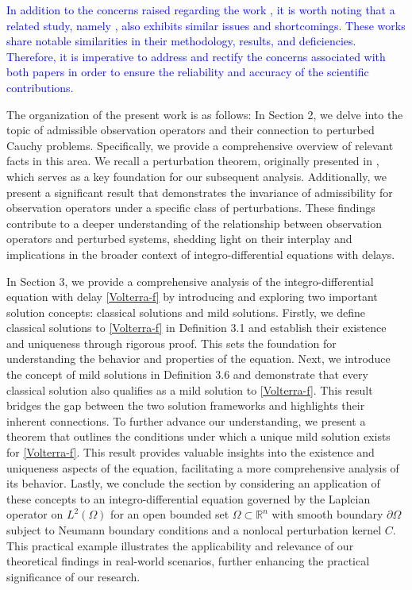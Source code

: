 \documentclass[12pt]{amsart}
\newcommand{\R}{{\mathbb R}}
\def\Om{\Omega}
\theoremstyle{definition}
\theoremstyle{remark}
\theoremstyle{example}
\def\R{\mathbb R}
\begin{document}
\textcolor{blue}{In addition to the concerns raised regarding the work \cite{Zaza}, it is worth noting that a related study, namely \cite{Zaza1}, also exhibits similar issues and shortcomings. These works share notable similarities in their methodology, results, and deficiencies. Therefore, it is imperative to address and rectify the concerns associated with both papers in order to ensure the reliability and accuracy of the scientific contributions.}

The organization of the present work is as follows: In Section 2, we delve into the topic of admissible observation operators and their connection to perturbed Cauchy problems. Specifically, we provide a comprehensive overview of relevant facts in this area. We recall a perturbation theorem, originally presented in \cite{Hadd}, which serves as a key foundation for our subsequent analysis. Additionally, we present a significant result that demonstrates the invariance of admissibility for observation operators under a specific class of perturbations. These findings contribute to a deeper understanding of the relationship between observation operators and perturbed systems, shedding light on their interplay and implications in the broader context of integro-differential equations with delays.

In Section 3, we provide a comprehensive analysis of the integro-differential equation with delay \eqref{Volterra-f} by introducing and exploring two important solution concepts: classical solutions and mild solutions. Firstly, we define classical solutions to \eqref{Volterra-f} in Definition 3.1 and establish their existence and uniqueness through rigorous proof. This sets the foundation for understanding the behavior and properties of the equation. Next, we introduce the concept of mild solutions in Definition 3.6 and demonstrate that every classical solution also qualifies as a mild solution to \eqref{Volterra-f}. This result bridges the gap between the two solution frameworks and highlights their inherent connections. To further advance our understanding, we present a theorem that outlines the conditions under which a unique mild solution exists for \eqref{Volterra-f}. This result provides valuable insights into the existence and uniqueness aspects of the equation, facilitating a more comprehensive analysis of its behavior. Lastly, we conclude the section by considering an application of these concepts to an integro-differential equation governed by the Laplcian operator on $L^2(\Om)$ for an open bounded set $\Om\subset \R^n$ with smooth boundary $\partial\Om$ subject to Neumann boundary conditions and a nonlocal perturbation kernel $C$. This practical example illustrates the applicability and relevance of our theoretical findings in real-world scenarios, further enhancing the practical significance of our research.
\end{document}
